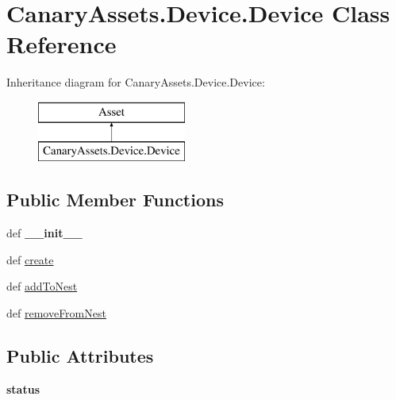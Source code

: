 \hypertarget{class_canary_assets_1_1_device_1_1_device}{\section{Canary\-Assets.\-Device.\-Device Class Reference}
\label{class_canary_assets_1_1_device_1_1_device}
}
Inheritance diagram for Canary\-Assets.\-Device.\-Device\-:\begin{figure}[H]
\begin{center}
\leavevmode
\includegraphics[height=2.000000cm]{class_canary_assets_1_1_device_1_1_device}
\end{center}
\end{figure}
\subsection*{Public Member Functions}
\begin{DoxyCompactItemize}
\item 
\hypertarget{class_canary_assets_1_1_device_1_1_device_ae1491c142e011fd608d2bf185a398d73}{def {\bfseries \-\_\-\-\_\-init\-\_\-\-\_\-}}\label{class_canary_assets_1_1_device_1_1_device_ae1491c142e011fd608d2bf185a398d73}

\item 
def \hyperlink{class_canary_assets_1_1_device_1_1_device_ad06a4aeb7c5e74c4714874cce699ce4c}{create}
\item 
def \hyperlink{class_canary_assets_1_1_device_1_1_device_aa923fdac7f6bf5cb504f857fde36d92f}{add\-To\-Nest}
\item 
def \hyperlink{class_canary_assets_1_1_device_1_1_device_a170ceac43e5fc92c64d75a022c165b2e}{remove\-From\-Nest}
\end{DoxyCompactItemize}
\subsection*{Public Attributes}
\begin{DoxyCompactItemize}
\item 
\hypertarget{class_canary_assets_1_1_device_1_1_device_a019c36f9397232cb1f7b9b81da49aad5}{{\bfseries status}}\label{class_canary_assets_1_1_device_1_1_device_a019c36f9397232cb1f7b9b81da49aad5}

\end{DoxyCompactItemize}


